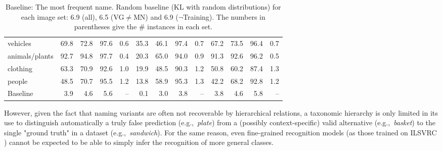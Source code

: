 \begin{table}[t]
\begin{tabular}{l@{~}|@{~}r@{~}r@{~}rr@{~}|@{~}r@{~}r@{~}rr@{~}|@{~}r@{~}r@{~}rr}
		vehicles       &               69.8 &                 72.8 &                   97.6 &            0.6 &            35.3 &              46.1 &                97.4 &         0.7 &             67.2 &               73.5 &                 96.4 &          0.7 \\
		animals/plants &               92.7 &                 94.8 &                   97.7 &            0.4 &            20.3 &              65.0 &                94.0 &         0.9 &             91.3 &               92.6 &                 96.2 &          0.5 \\
		clothing       &               63.3 &                 70.9 &                   92.6 &            1.0 &            19.9 &              48.5 &                90.3 &         1.2 &             50.8 &               60.2 &                 87.4 &          1.3 \\
		people         &               48.5 &                 70.7 &                   95.5 &            1.2 &            13.8 &              58.9 &                95.3 &         1.3 &             42.2 &               68.2 &                 92.8 &          1.2 \\
		\bottomrule
		Baseline       &                3.9 &                  4.6 &                    5.6 &            -- &             0.1 &               3.0 &                 3.8 &         -- &              3.8 &                4.6 &                  5.8 &          -- \\
	\end{tabular}
	\caption{Baseline: The most frequent name. Random baseline (KL with random distributions) for each image set: 6.9 (all), 6.5 (VG$\neq$MN) and 6.9 ($\neg$Training). The numbers in parentheses give the \# instances in each set.	\label{tab:model}}
\end{table}
%
However, given the fact that naming variants are often not recoverable by hierarchical relations, a taxonomic hierarchy is only limited in its use to distinguish automatically a truly false prediction (e.g.,\ \textsl{plate}) from a (possibly context-specific) valid alternative (e.g.,\ \textsl{basket}) to the single "ground truth" in a dataset (e.g.,\ \textsl{sandwich}). 
For the same reason, even fine-grained recognition models (as those trained on ILSVRC \cite{ILSVRC15}) cannot be expected to be able to simply infer the recognition of more general classes.
%

